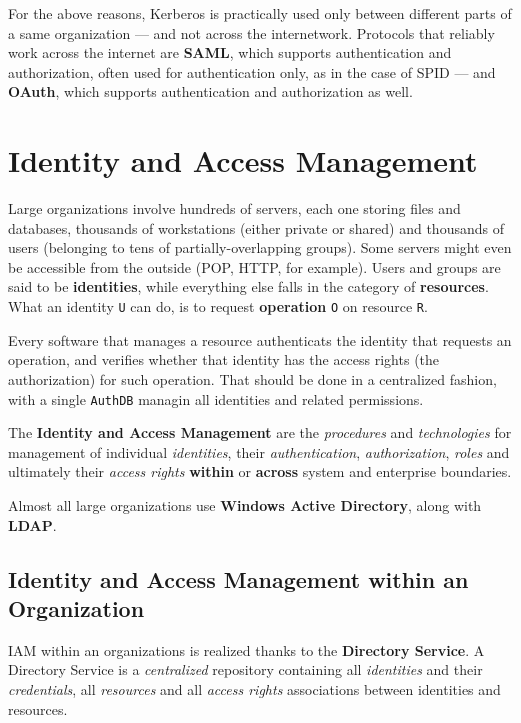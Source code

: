 \documentclass[10pt]{extreport}
\begin{document}
For the above reasons, Kerberos is practically used only between different
parts of a same organization --- and not across the internetwork. Protocols that
reliably work across the internet are \textbf{SAML}, which supports
authentication and authorization, often used for authentication only, as in the
case of SPID --- and \textbf{OAuth}, which supports authentication and
authorization as well.






\chapter{Identity and Access Management}

Large organizations involve hundreds of servers, each one storing files and
databases, thousands of workstations (either private or shared) and thousands
of users (belonging to tens of partially\--overlapping groups). Some servers
might even be accessible from the outside (POP, HTTP, for example). Users and
groups are said to be \textbf{identities}, while everything else falls in the
category of \textbf{resources}. What an identity \texttt{U} can do, is to
request \textbf{operation} \texttt{O} on resource \texttt{R}. 

Every software that manages a resource authenticats the identity that requests
an operation, and verifies whether that identity has the access rights (the
authorization) for such operation. That should be done in a centralized
fashion, with a single \texttt{AuthDB} managin all identities and related
permissions.

The \textbf{Identity and Access Management} are the \emph{procedures} and
\emph{technologies} for management of individual \emph{identities}, their
\emph{authentication}, \emph{authorization}, \emph{roles} and ultimately their
\emph{access rights} \textbf{within} or \textbf{across} system and enterprise
boundaries.

Almost all large organizations use \textbf{Windows Active Directory}, along
with \textbf{LDAP}.

\section{Identity and Access Management within an Organization}

IAM within an organizations is realized thanks to the \textbf{Directory
Service}. A Directory Service is a \emph{centralized} repository containing all
\emph{identities} and their \emph{credentials}, all \emph{resources} and all
\emph{access rights} associations between identities and resources.
\end{document}

